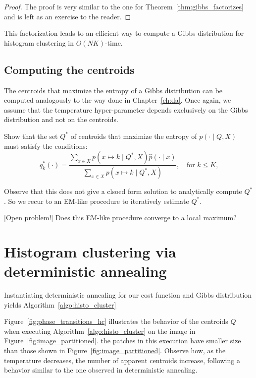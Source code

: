 \begin{proof}
The proof is very similar to the one for Theorem~\ref{thm:gibbs_factorizes} and is left as an exercise to the reader.
\end{proof}

This factorization leads to an efficient way to compute a Gibbs distribution for histogram clustering in $O(NK)$-time.

\subsection{Computing the centroids}

The centroids that maximize the entropy of a Gibbs distribution can be computed analogously to the way done in Chapter~\ref{ch:da}. Once again, we assume that the temperature hyper-parameter depends exclusively on the Gibbs distribution and not on the centroids.

\begin{exercise}
Show that the set $Q^*$ of centroids that maximize the entropy of $p(\cdot \mid Q, X)$ must satisfy the conditions:
%
\begin{equation}
q^*_k(\cdot) = \frac{\sum_{x \in X}p(x \mapsto k \mid Q^*, X)\hat{p}\left(\cdot \mid x\right)}{\sum_{x \in X} p(x \mapsto k \mid Q^*, X)}, \quad \text{for $k \leq K$,}
\end{equation}
%
\end{exercise}

Observe that this does not give a clsoed form solution to analytically compute $Q^*$. So we recur to an EM-like procedure to iteratively estimate $Q^*$.

\begin{exercise}{[Open problem!]}
Does this EM-like procedure converge to a local maximum?
\end{exercise}

\section{Histogram clustering via deterministic annealing}

Instantiating deterministic annealing for our cost function and Gibbs distribution yields Algorithm~\ref{algo:histo_cluster}

Figure~\ref{fig:phase_transitions_hc} illustrates the behavior of the centroids $Q$ when executing Algorithm~\ref{algo:histo_cluster} on the image in Figure~\ref{fig:image_partitioned}. the patches in this execution have smaller size than those shown in Figure~\ref{fig:image_partitioned}. Observe how, as the temperature decreases, the number of apparent centroids increase, following a behavior similar to the one observed in deterministic annealing.

